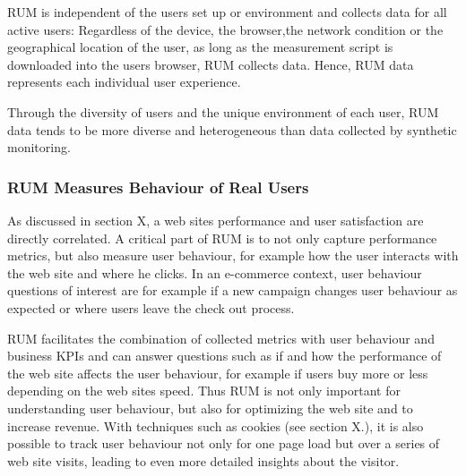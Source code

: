 
RUM is independent of the users set up or environment and collects data for all active users:
Regardless of the device, the browser,the network condition or the geographical location of the user, as long as the measurement script is downloaded into the users browser, RUM collects data.%
Hence, RUM data represents each individual user experience. %

Through the diversity of users and the unique environment of each user,  RUM data tends to be more diverse and heterogeneous than data collected by synthetic monitoring. %



\subsubsection{RUM Measures Behaviour of Real Users}



As discussed in section X, a web sites performance and user satisfaction are directly correlated.
A critical part of RUM is to not only capture performance metrics, but also measure user behaviour, for example how the user interacts with the web site and where he clicks. %
In an e-commerce context, user behaviour questions of interest are for example if a new campaign changes user behaviour as expected or where users leave the check out process. %

RUM facilitates the combination of collected metrics with user behaviour and business KPIs and can answer questions such as if and how the performance of the web site affects the user behaviour, for example if users buy more or less depending on the web sites speed.%
Thus RUM is not only important for understanding user behaviour, but also for optimizing the web site and to increase revenue.
With techniques such as cookies (see section X.), it is also possible to track user behaviour not only for one page load but over a series of web site visits, leading to even more detailed insights about the visitor. %


